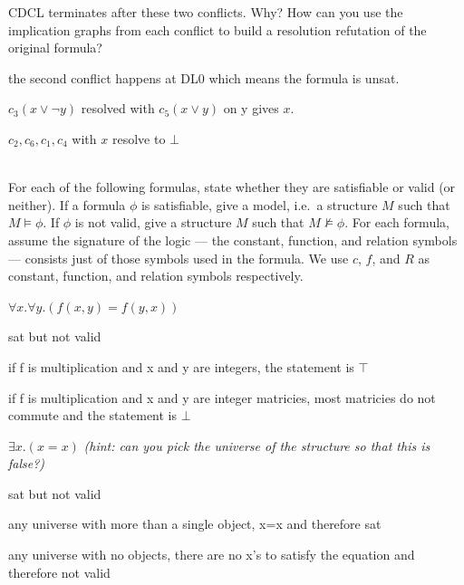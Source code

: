 \documentclass[11pt]{article}
\begin{document}
\begin{qunlist}
\begin{qparts}
  \item
    CDCL terminates after these two conflicts. Why? How can you use the implication graphs from each conflict to build a resolution refutation of the original formula?

    \begin{answer}
      the second conflict happens at DL0 which means the formula is unsat.

      \(c_3 (x \lor ¬y)\) resolved with \(c_5 (x \lor y)\) on y gives \(x\).

      \(c_2,c_6,c_1,c_4\) with \(x\) resolve to \(\bot\)



    \end{answer}

  \end{qparts}

  \\
  For each of the following formulas, state whether they are satisfiable or valid (or neither).
  If a formula $\phi$ is satisfiable, give a model, i.e.~a structure $M$ such that $M \models \phi$.
  If $\phi$ is not valid, give a structure $M$ such that $M \not \models \phi$.
  For each formula, assume the signature of the logic --- the constant, function, and relation symbols --- consists just of those symbols used in the formula.
  We use $c$, $f$, and $R$ as constant, function, and relation symbols respectively.
  \begin{qparts}
  \item
    $\forall x . \forall y . (f(x, y) = f(y, x))$

    \begin{answer}
      sat but not valid

      if f is multiplication and x and y are integers, the statement is \(\top\)

      if f is multiplication and x and y are integer matricies, most matricies do not commute and the statement is \(\bot\)
    \end{answer}

  \item
    $\exists x. (x = x)$ \quad \emph{(hint: can you pick the universe of the structure so that this is false?)}

    \begin{answer}
      sat but not valid

      any universe with more than a single object, x=x and therefore sat

      any universe with no objects, there are no x's to satisfy the equation and therefore not valid
    \end{answer}


\end{qparts}
\end{qunlist}
\end{document}
